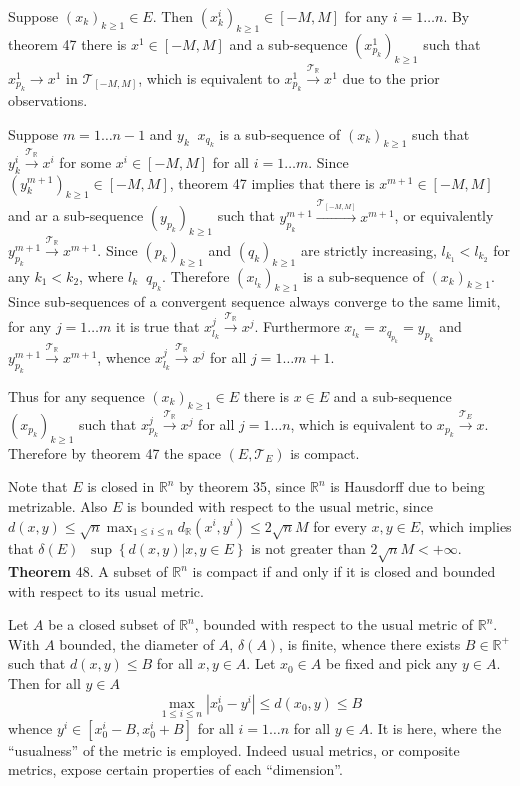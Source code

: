 \documentclass[a4paper]{article}
\newcommand{\obj}[1]{\left\{ #1 \right \}}
\newcommand{\clo}[1]{\left [ #1 \right ]}
\newcommand{\brac}[1]{\left ( #1 \right )}
\newcommand{\induc}[1]{\left . #1 \right \vert}
\newcommand{\abs}[1]{\left | #1 \right |}
\newcommand{\Real}{\mathbb{R}}
\newcommand{\Tcal}{\mathcal{T}}
\newcommand{\defn}{\mathop{\overset{\Delta}{=}}\nolimits}
\begin{document}
Suppose $\brac{x_k}_{k\geq 1}\in E$. Then $\brac{x_k^i}_{k\geq 1}\in \clo{-M,M}$ for any $i=1\ldots n$. By theorem 47 there is $x^1\in \clo{-M,M}$ and a sub-sequence $\brac{x_{p_k}^1}_{k\geq 1}$ such that $x_{p_k}^1\to x^1$ in $\Tcal_{\clo{-M,M}}$, which is equivalent to $x_{p_k}^1\overset{\Tcal_\Real}{\to} x^1$ due to the prior observations.

Suppose $m=1\ldots {n-1}$ and $y_k\defn x_{q_k}$ is a sub-sequence of $\brac{x_k}_{k\geq 1}$ such that $y_k^i\overset{\Tcal_\Real}{\to} x^i$ for some $x^i\in \clo{-M,M}$ for all $i=1\ldots m$. Since $\brac{y_k^{m+1}}_{k\geq 1}\in\clo{-M,M}$, theorem 47 implies that there is $x^{m+1}\in \clo{-M,M}$ and ar a sub-sequence $\brac{y_{p_k}}_{k\geq 1}$ such that $y_{p_k}^{m+1}\overset{\Tcal_{\clo{-M,M}}}{\to} x^{m+1}$, or equivalently $y_{p_k}^{m+1}\overset{\Tcal_\Real}{\to} x^{m+1}$. Since $\brac{p_k}_{k\geq 1}$ and $\brac{q_k}_{k\geq 1}$ are strictly increasing, $l_{k_1}<l_{k_2}$ for any $k_1<k_2$, where $l_k\defn q_{p_k}$. Therefore $\brac{x_{l_k}}_{k\geq 1}$ is a sub-sequence of $\brac{x_k}_{k\geq 1}$. Since sub-sequences of a convergent sequence always converge to the same limit, for any $j=1\ldots m$ it is true that $x_{l_k}^j\overset{\Tcal_\Real}{\to} x^j$. Furthermore $x_{l_k}=x_{q_{p_k}}=y_{p_k}$ and $y_{p_k}^{m+1}\overset{\Tcal_\Real}{\to} x^{m+1}$, whence $x_{l_k}^j\overset{\Tcal_\Real}{\to} x^j$ for all $j=1\ldots {m+1}$.

Thus for any sequence $\brac{x_k}_{k\geq 1}\in E$ there is $x\in E$ and a sub-sequence $\brac{x_{p_k}}_{k\geq 1}$ such that $x_{p_k}^j\overset{\Tcal_\Real}{\to} x^j$ for all $j=1\ldots n$, which is equivalent to $x_{p_k}\overset{\Tcal_E}{\to} x$. Therefore by theorem 47 the space $\brac{E,\Tcal_E}$ is compact.

Note that $E$ is closed in $\Real^n$ by theorem 35, since $\Real^n$ is Hausdorff due to being metrizable. Also $E$ is bounded with respect to the usual metric, since $d\brac{x,y} \leq \sqrt{n}\max_{1\leq i\leq n} d_\Real\brac{x^i,y^i}\leq 2\sqrt{n} M$ for every $x,y\in E$, which implies that $\delta\brac{E}\defn \sup\obj{ \induc{ d\brac{x, y} } x, y\in E }$ is not greater than $2\sqrt{n} M < +\infty$.\\

\label{thm:bounded_metric_compact} \noindent \textbf{Theorem} 48.
A subset of $\Real^n$ is compact if and only if it is closed and bounded with respect to its usual metric.

Let $A$ be a closed subset of $\Real^n$, bounded with respect to the usual metric of $\Real^n$. With $A$ bounded, the diameter of $A$, $\delta\brac{A}$, is finite, whence there exists $B\in \Real^+$ such that $d\brac{x,y}\leq B$ for all $x,y\in A$. Let $x_0\in A$ be fixed and pick any $y\in A$. Then for all $y\in A$ \[\max_{1\leq i\leq n} \abs{x_0^i-y^i} \leq d\brac{x_0,y}\leq B\] whence $y^i\in \clo{x_0^i-B, x_0^i+B}$ for all $i=1\ldots n$ for all $y\in A$. It is here, where the ``usualness'' of the metric is employed. Indeed usual metrics, or composite metrics, expose certain properties of each ``dimension''.
\end{document}
